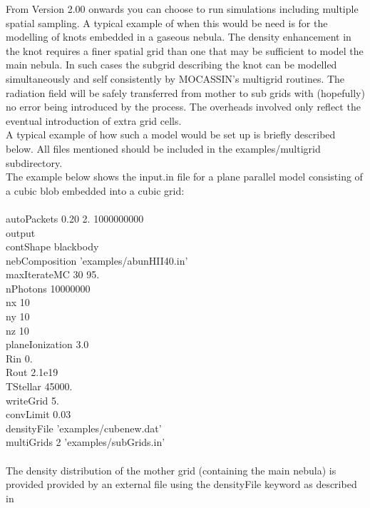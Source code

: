 \documentclass[11pt]{article}
\begin{document}
   From Version 2.00 onwards you can choose to run simulations including multiple 
   spatial sampling. A typical example of when this would be need is for the modelling
   of knots embedded in a gaseous nebula. The density enhancement in the knot requires
   a finer spatial grid than one that may be sufficient to model the main nebula. In 
   such cases the subgrid describing the knot can be modelled simultaneously and 
   self consistently by MOCASSIN's multigrid routines. The radiation field will be safely 
   transferred from mother to sub grids with (hopefully) no error being introduced by 
   the process. The overheads involved only reflect the eventual introduction of extra 
   grid cells. \\
   A typical example of how such a model would be set up is briefly described below. All 
   files mentioned should be included in the examples/multigrid subdirectory.\\
   The example below shows the input.in file for a plane parallel model consisting of
   a cubic blob embedded into a cubic grid: \\
   \\
\indent  autoPackets 0.20 2. 1000000000\\
\indent        output\\
\indent        contShape  blackbody\\
\indent        nebComposition 'examples/abunHII40.in'\\
\indent        maxIterateMC  30 95.\\
\indent        nPhotons 10000000\\
\indent        nx 10\\
\indent        ny 10\\
\indent        nz 10\\
\indent        planeIonization 3.0\\
\indent        Rin 0.\\
\indent        Rout 2.1e19\\
\indent        TStellar 45000.\\
\indent        writeGrid 5.\\
\indent        convLimit 0.03\\
\indent        densityFile 'examples/cubenew.dat'\\
\indent        multiGrids 2 'examples/subGrids.in'\\
\\
   The density distribution of the mother grid (containing the main nebula) is
   provided provided by an external file using the densityFile keyword as described in 
\end{document}
